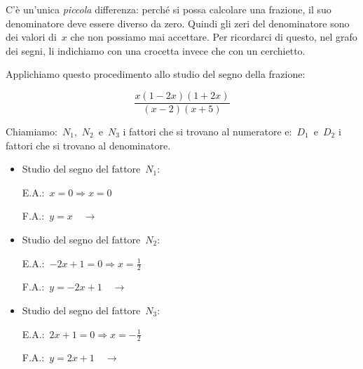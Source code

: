 C'è un'unica \emph{piccola} differenza: perché si possa calcolare una frazione,
il suo denominatore deve essere diverso da zero. Quindi gli zeri del
denominatore sono dei valori di~$x$ che non possiamo mai accettare.
Per ricordarci di questo, nel grafo dei segni, li indichiamo con una crocetta
invece che con un cerchietto.

 \begin{esempio}
Applichiamo questo procedimento allo studio del segno della frazione:

\[\frac{x(1 -2 x)(1 + 2 x)}{(x -2)(x +5)}\]

Chiamiamo:~$N_1$,~$N_2$~e~$N_3$ i fattori che si trovano al numeratore
e:~$D_1$~e~$D_2$ i fattori che si trovano al denominatore.

\begin{itemize} [noitemsep]
 \item Studio del segno del fattore~$N_1$:\\
 \begin{minipage}{.45\textwidth}
  E.A.:~$x=0 \Rightarrow x=0$
 \end{minipage}
 \begin{minipage}{.25\textwidth}
  F.A.:~$y = x \quad \rightarrow$
 \end{minipage}
 \begin{minipage}{.3\textwidth}
  
 \end{minipage}
 \item Studio del segno del fattore~$N_2$:\\
 \begin{minipage}{.45\textwidth}
  E.A.:~$-2 x +1=0 \Rightarrow x=\frac{1}{2}$
 \end{minipage}
 \begin{minipage}{.25\textwidth}
  F.A.:~$y = -2 x +1 \quad \rightarrow$
 \end{minipage}
 \begin{minipage}{.3\textwidth}
  
 \end{minipage}
 \item Studio del segno del fattore~$N_3$:\\
 \begin{minipage}{.45\textwidth}
  E.A.:~$2 x +1=0 \Rightarrow x=- \frac{1}{2}$
 \end{minipage}
 \begin{minipage}{.25\textwidth}
  F.A.:~$y=2 x +1 \quad \rightarrow$
 \end{minipage}

\end{itemize}
\end{esempio}
